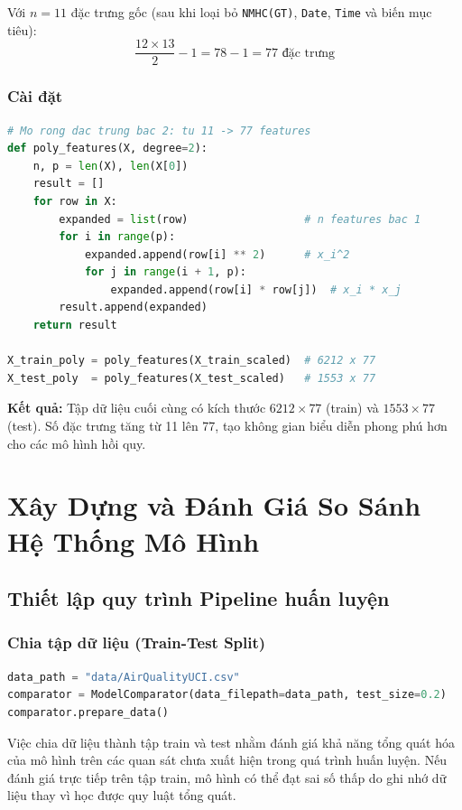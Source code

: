\documentclass[12pt,a4paper]{report}
\begin{document}
Với $n = 11$ đặc trưng gốc (sau khi loại bỏ \texttt{NMHC(GT)}, \texttt{Date}, \texttt{Time} và biến mục tiêu):
\[
\frac{12 \times 13}{2} - 1 = 78 - 1 = 77 \text{ đặc trưng}
\]

\subsubsection{Cài đặt}

\begin{lstlisting}[language=Python]
# Mo rong dac trung bac 2: tu 11 -> 77 features
def poly_features(X, degree=2):
    n, p = len(X), len(X[0])
    result = []
    for row in X:
        expanded = list(row)                  # n features bac 1
        for i in range(p):
            expanded.append(row[i] ** 2)      # x_i^2
            for j in range(i + 1, p):
                expanded.append(row[i] * row[j])  # x_i * x_j
        result.append(expanded)
    return result

X_train_poly = poly_features(X_train_scaled)  # 6212 x 77
X_test_poly  = poly_features(X_test_scaled)   # 1553 x 77
\end{lstlisting}

\textbf{Kết quả:} Tập dữ liệu cuối cùng có kích thước $6212 \times 77$ (train) và $1553 \times 77$ (test). Số đặc trưng tăng từ 11 lên 77, tạo không gian biểu diễn phong phú hơn cho các mô hình hồi quy.

\section{Xây Dựng và Đánh Giá So Sánh Hệ Thống Mô Hình}
\subsection{Thiết lập quy trình Pipeline huấn luyện}
\subsubsection{Chia tập dữ liệu (Train-Test Split)}
 
\begin{lstlisting}[language=Python]
data_path = "data/AirQualityUCI.csv"
comparator = ModelComparator(data_filepath=data_path, test_size=0.2)
comparator.prepare_data()
\end{lstlisting}

Việc chia dữ liệu thành tập train và test nhằm đánh giá khả năng tổng quát hóa của mô hình trên các quan sát chưa xuất hiện trong quá trình huấn luyện. Nếu đánh giá trực tiếp trên tập train, mô hình có thể đạt sai số thấp do ghi nhớ dữ liệu thay vì học được quy luật tổng quát.
 
\end{document}
